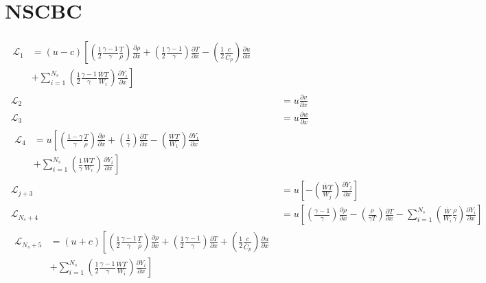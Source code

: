 \section{NSCBC}\label{app:nscbc}
\begin{subequations}
\begin{align}
  \begin{split}
    \mathcal{L}_1&=(u-c)\left[ \left( \frac{1}{2} \frac{\gamma -1}{\gamma} \frac{T}{\rho} \right) \frac{\partial \rho}{\partial x} + \left( \frac{1}{2} \frac{\gamma -1}{\gamma} \right) \frac{\partial T}{\partial x}  -  \left( \frac{1}{2} \frac{c}{\overline{C}_p}  \right) \frac{\partial u}{\partial x} \right.\\
      &\left. + \sum_{i=1}^{N_s} \left(  \frac{1}{2} \frac{\gamma -1}{\gamma} \frac{\overline{W}T}{W_i} \right) \frac{\partial Y_i}{\partial x}   \right]
  \end{split}\label{eq:l1}\\
~
  \mathcal{L}_2&= u \frac{\partial v}{\partial x}\label{eq:l2}\\
~
  \mathcal{L}_3&= u \frac{\partial w}{\partial x}\label{eq:l3}\\
~
  \begin{split}
    \mathcal{L}_4&=u \left[ \left( \frac{1- \gamma}{\gamma} \frac{T}{\rho} \right) \frac{\partial \rho}{\partial x} + \left( \frac{1}{\gamma} \right) \frac{\partial T}{\partial x} - \left( \frac{\overline{W}T}{W_1} \right) \frac{\partial Y_1}{\partial x} \right. \\
      &\left. + \sum_{i=1}^{N_s} \left(  \frac{1}{\gamma} \frac{\overline{W}T}{W_i} \right) \frac{\partial Y_i}{\partial x}  \right]
    \end{split}\\
~
  \mathcal{L}_{j+3}&=u  \left[ - \left( \frac{\overline{W}T}{W_j} \right) \frac{\partial Y_j}{\partial x} \right]\\
~
  \mathcal{L}_{N_s+4}&=u \left[ \left( \frac{\gamma -1}{\gamma} \right) \frac{\partial \rho}{\partial x} - \left( \frac{\rho}{\gamma T} \right) \frac{\partial T}{\partial x} - \sum_{i=1}^{N_s} \left(  \frac{\overline{W}}{W_i} \frac{\rho}{\gamma} \right) \frac{\partial Y_i}{\partial x}  \right]\\
~
  \begin{split}
    \mathcal{L}_{N_s+5}&=(u+c)\left[ \left( \frac{1}{2} \frac{\gamma -1}{\gamma} \frac{T}{\rho} \right) \frac{\partial \rho}{\partial x} + \left( \frac{1}{2} \frac{\gamma -1}{\gamma} \right) \frac{\partial T}{\partial x}  +  \left( \frac{1}{2} \frac{c}{\overline{C}_p}  \right) \frac{\partial u}{\partial x} \right.\\
      &\left. + \sum_{i=1}^{N_s} \left(  \frac{1}{2} \frac{\gamma -1}{\gamma} \frac{\overline{W}T}{W_i} \right) \frac{\partial Y_i}{\partial x}   \right]
  \end{split}\label{eq:llast}
\end{align}
\end{subequations}




